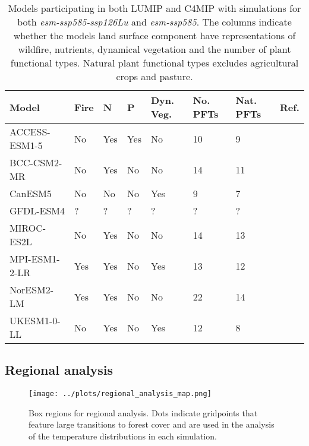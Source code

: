 \documentclass[]{article}
\begin{document}
\begin{table}[H]
    \centering
    \begin{tabular}{llllllll}
        \hline
Model         & Fire & N & P & Dyn. Veg. & No. PFTs & Nat. PFTs & Ref.                                         \\ \hline
ACCESS-ESM1-5 & No   & Yes      & Yes        & No                 & 10       & 9                   & \cite{ziehn_australian_2020}   \\
BCC-CSM2-MR   & No   & Yes      & No         & No                 & 14       & 11                  & \cite{li_development_2019}     \\
CanESM5       & No   & No       & No         & Yes                & 9        & 7                   & \cite{swart_canadian_2019}     \\
GFDL-ESM4     & ?    & ?        & ?          & ?                  & ?        & ?                   & \cite{dunne_gfdl_2020}         \\
MIROC-ES2L    & No   & Yes      & No         & No                 & 14       & 13                  & \cite{hajima_development_2020} \\
MPI-ESM1-2-LR & Yes  & Yes      & No         & Yes                & 13       & 12                  & \cite{giorgetta_climate_2013}  \\
NorESM2-LM    & Yes  & Yes      & No         & No                 & 22       & 14                  & \cite{seland_norwegian_2020}   \\
UKESM1-0-LL   & No   & Yes      & No         & Yes                & 12       & 8                   & \cite{sellar_ukesm1_2019}      \\ \hline
    \end{tabular}
    \caption{Models participating in both LUMIP and C4MIP with simulations for both \textit{esm-ssp585-ssp126Lu} and \textit{esm-ssp585}. The columns indicate whether the models land surface component have representations of wildfire, nutrients, dynamical vegetation and the number of plant functional types. Natural plant functional types excludes agricultural crops and pasture.}
    \label{tab:models}
\end{table}

\subsection{Regional analysis}

\begin{figure}[H]
    \centering
    \texttt{[image: ../plots/regional\_analysis\_map.png]}
    \caption{Box regions for regional analysis. Dots indicate gridpoints that feature large transitions to forest cover and are used in the analysis of the temperature distributions in each simulation.}
    \label{fig:box_regions}
\end{figure}
\end{document}
